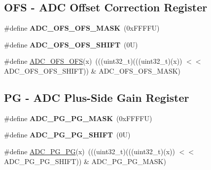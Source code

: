 \subsection*{O\+FS -\/ A\+DC Offset Correction Register}
\begin{DoxyCompactItemize}
\item 
\mbox{\label{group___a_d_c___register___masks_ga1532ae43eb63d6c071f531cca89fdb68}} 
\#define {\bfseries A\+D\+C\+\_\+\+O\+F\+S\+\_\+\+O\+F\+S\+\_\+\+M\+A\+SK}~(0x\+F\+F\+F\+F\+U)
\item 
\mbox{\label{group___a_d_c___register___masks_ga86de5d25a5433db6e96700e2d000ad07}} 
\#define {\bfseries A\+D\+C\+\_\+\+O\+F\+S\+\_\+\+O\+F\+S\+\_\+\+S\+H\+I\+FT}~(0\+U)
\item 
\#define \mbox{\hyperlink{group___a_d_c___register___masks_gad48888faa6b880f4011253b53413f37b}{A\+D\+C\+\_\+\+O\+F\+S\+\_\+\+O\+FS}}(x)~(((uint32\+\_\+t)(((uint32\+\_\+t)(x)) $<$$<$ A\+D\+C\+\_\+\+O\+F\+S\+\_\+\+O\+F\+S\+\_\+\+S\+H\+I\+FT)) \& A\+D\+C\+\_\+\+O\+F\+S\+\_\+\+O\+F\+S\+\_\+\+M\+A\+SK)
\end{DoxyCompactItemize}
\subsection*{PG -\/ A\+DC Plus-\/\+Side Gain Register}
\begin{DoxyCompactItemize}
\item 
\mbox{\label{group___a_d_c___register___masks_ga0619279d8dcf43af1fda9f27090ae51b}} 
\#define {\bfseries A\+D\+C\+\_\+\+P\+G\+\_\+\+P\+G\+\_\+\+M\+A\+SK}~(0x\+F\+F\+F\+F\+U)
\item 
\mbox{\label{group___a_d_c___register___masks_ga014623fb35c473d12ff7fc64c3e8cfe3}} 
\#define {\bfseries A\+D\+C\+\_\+\+P\+G\+\_\+\+P\+G\+\_\+\+S\+H\+I\+FT}~(0\+U)
\item 
\#define \mbox{\hyperlink{group___a_d_c___register___masks_ga4b6bf1c895aa431e08bed733de13e71e}{A\+D\+C\+\_\+\+P\+G\+\_\+\+PG}}(x)~(((uint32\+\_\+t)(((uint32\+\_\+t)(x)) $<$$<$ A\+D\+C\+\_\+\+P\+G\+\_\+\+P\+G\+\_\+\+S\+H\+I\+FT)) \& A\+D\+C\+\_\+\+P\+G\+\_\+\+P\+G\+\_\+\+M\+A\+SK)
\end{DoxyCompactItemize}
